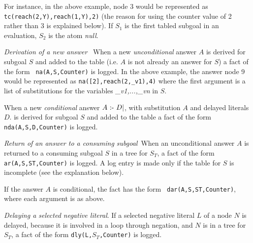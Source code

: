   For instance, in the above example, node 3 would be represented as
  {\tt tc(reach(2,Y),reach(1,Y),2)} (the reason for using the counter
  value of 2 rather than 3 is explained below).  If $S_1$ is the first
  tabled subgoal in an evaluation, $S_2$ is the atom {\em null}.

\item {\em Derivation of a new answer}~ When a new {\em unconditional}
  answer $A$ is derived for subgoal $S$ and added to the table
  (i.e. $A$ is not already an answer for $S$) a fact of the form {\tt
    na(A,S,Counter)} is logged.  In the above example, the answer node
  9 would be represented as {\tt na([2],reach(2,\_v1),4)} where the
  first argument is a list of substitutions for the variables {\em
    \_v1,...,\_vn} in $S$.

  When a new {\em conditional} answer $A \mbox{ :- } D|$, with substitution
  $A$ and delayed literals $D$. is derived for subgoal $S$ and added
  to the table a fact of the form {\tt nda(A,S,D,Counter)} is logged.

\item {\em Return of an answer to a consuming subgoal}~When an
  unconditional answer $A$ is returned to a consuming subgoal $S$ in a
  tree for $S_T$, a fact of the form {\tt ar(A,S,ST,Counter)} is
  logged.  A log entry is made only if the table for $S$ is incomplete
  (see the explanation below).

  If the answer $A$ is conditional, the fact has the form {\tt
    dar(A,S,ST,Counter)}, where each argument is as above.

\item {\em Delaying a selected negative literal}.  If a selected
  negative literal $L$ of a node $N$ is delayed, because it is
  involved in a loop through negation, and $N$ is in a tree for $S_T$,
  a fact of the form {\tt dly(L,$S_T$,Counter)} is logged.

